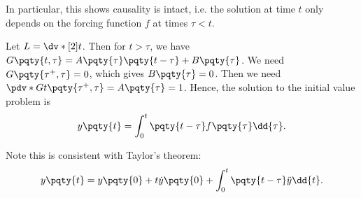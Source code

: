 In particular, this shows causality is intact, i.e. the solution at time \(t\) only depends on the forcing function \(f\) at times \(\tau < t\).

\begin{example}
    Let \(L = \dv*[2]{t}\). Then for \(t > \tau\), we have \(G\pqty{t, \tau} = A\pqty{\tau} \pqty{t - \tau} + B\pqty{\tau}\). We need \(G\pqty{\tau^+, \tau} = 0\), which gives \(B\pqty{\tau} = 0\). Then we need \(\pdv*{G}{t} \pqty{\tau^+, \tau} = A\pqty{\tau} = 1\). Hence, the solution to the initial value problem is
    \begin{equation}
        y\pqty{t} = \int_{0}^{t} \pqty{t - \tau} f\pqty{\tau} \dd{\tau}.
    \end{equation}

    Note this is consistent with Taylor's theorem:
    \begin{equation}
        y\pqty{t} = y\pqty{0} + t \dot{y}\pqty{0} + \int_{0}^{t} \pqty{t - \tau} \ddot{y} \dd{t}.
    \end{equation}
\end{example}